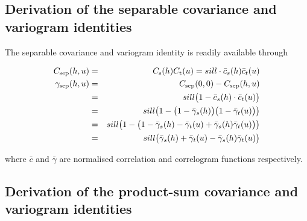 \subsection*{Derivation of the separable covariance and variogram identities}\label{sec:derivSep}

The separable covariance and variogram identity is readily available through

\begin{eqnarray*}
C_{\rm sep}(h,u) &=& C_{\rm s}(h)C_{\rm t}(u) = sill \cdot \bar{c}_s(h)\bar{c}_t(u) \\
\gamma_{\rm sep}(h,u) &=& C_{\rm sep}(0,0) - C_{\rm sep}(h,u) \\
 &=& sill \big(1- \bar{c}_s(h) \cdot \bar{c}_t(u) \big) \\
 &=& sill \big(1- \big(1-\bar{\gamma}_s(h)\big)\big(1-\bar{\gamma}_t(u)\big) \big) \\
 &=& sill \big(1- \big(1-\bar{\gamma}_s(h) -\bar{\gamma}_t(u) + \bar{\gamma}_s(h)\bar{\gamma}_t(u)\big) \big) \\
 &=& sill \big(\bar{\gamma}_s(h) + \bar{\gamma}_t(u) - \bar{\gamma}_s(h)\bar{\gamma}_t(u)\big)
\end{eqnarray*}

where $\bar{c}$ and $\bar{\gamma}$ are normalised correlation and correlogram functions respectively.

\subsection*{Derivation of the product-sum covariance and variogram identities}\label{sec:derivPs}

